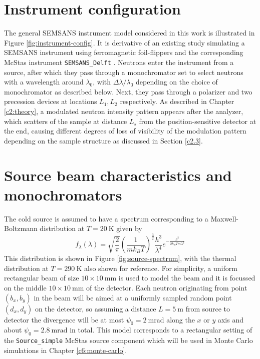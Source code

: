 \section{Instrument configuration}
\label{c3.1}
The general SEMSANS instrument model considered in this work is illustrated in Figure \ref{fig:instrument-config}. It is derivative of an existing study simulating a SEMSANS instrument using ferromagnetic foil-flippers and the corresponding McStas instrument \texttt{SEMSANS\_Delft} \cite{bouwman2021b}. Neutrons enter the instrument from a source, after which they pass through a monochromator set to select neutrons with a wavelength around $\lambda_0$, with  $\Delta\lambda/\lambda_0$ depending on the choice of monochromator as described below. Next, they pass through a polarizer and two precession devices at locations $L_1, L_2$ respectively. As described in Chapter \ref{c2:theory}, a modulated neutron intensity pattern appears after the analyzer, which scatters of the sample at distance $L_s$ from the position-sensitive detector at the end, causing different degrees of loss of visibility of the modulation pattern depending on the sample structure as discussed in Section \ref{c2.3}. 

\section{Source beam characteristics and monochromators}
\label{c3.2}
The cold source is assumed to have a spectrum corresponding to a Maxwell-Boltzmann distribution at $T = \SI{20}{\kelvin}$ given by 
\begin{equation}
	f_\lambda(\lambda) = \sqrt{\frac{2}{\pi}}\left(\frac{1}{mk_BT}\right)^{\frac{3}{2}}\frac{h^3}{\lambda^4}e^{-\frac{h^2}{2k_BTm\lambda^2}} \label{eq:cold-source-spectrum}
\end{equation}
This distribution is shown in Figure \ref{fig:source-spectrum}, with the thermal distribution at $T= \SI{290}{\kelvin}$ also shown for reference. For simplicity, a uniform rectangular beam of size $10\times10~\unit{\milli\meter}$ is used to model the beam and it is focussed on the middle $10\times10~\unit{\milli\meter}$ of the detector. Each neutron originating from point $(b_x,b_y)$ in the beam will be aimed at a uniformly sampled random point $(d_x, d_y)$ on the detector, so assuming a distance $L = \SI{5}{\meter}$ from source to detector the divergence will be at most $\psi_0 = \SI{2}{\milli\radian}$ along the $x$ or $y$ axis and about $\psi_0 = \SI{2.8}{\milli\radian}$ in total. This model corresponds to a rectangular setting of the \texttt{Source\_simple} McStas source component which will be used in Monte Carlo simulations in Chapter \ref{c6:monte-carlo}.  

